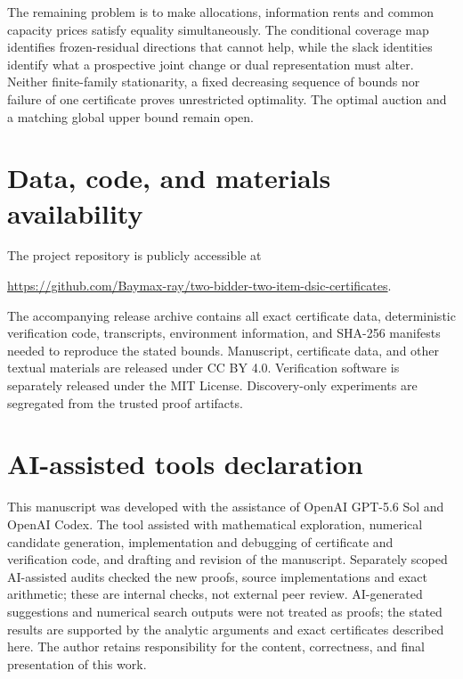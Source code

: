 \documentclass[11pt]{article}
\begin{document}
The remaining problem is to make allocations, information rents and common
capacity prices satisfy equality simultaneously. The conditional coverage
map identifies frozen-residual directions that cannot help, while the slack
identities identify what a prospective joint change or dual representation
must alter. Neither finite-family stationarity, a fixed decreasing sequence
of bounds nor failure of one certificate proves unrestricted optimality.
The optimal auction and a matching global upper bound remain open.

\section*{Data, code, and materials availability}

The project repository is publicly accessible at
\begin{center}\small
\url{https://github.com/Baymax-ray/two-bidder-two-item-dsic-certificates}.
\end{center}
The accompanying release archive contains all exact certificate data, deterministic
verification code, transcripts, environment information, and SHA-256
manifests needed to reproduce the stated bounds.  Manuscript, certificate
data, and other textual materials are released under CC BY 4.0.  Verification
software is separately released under the MIT License.  Discovery-only
experiments are segregated from the trusted proof artifacts.

\section*{AI-assisted tools declaration}

This manuscript was developed with the assistance of OpenAI GPT-5.6 Sol and OpenAI Codex.
The tool assisted with mathematical exploration, numerical candidate
generation, implementation and debugging of certificate and verification
code, and drafting and revision of the manuscript. Separately scoped AI-assisted
audits checked the new proofs, source implementations and exact arithmetic;
these are internal checks, not external peer review. AI-generated suggestions
and numerical search outputs were not treated as proofs; the stated results
are supported by the analytic arguments and exact certificates described
here.  The author retains responsibility for the content, correctness, and
final presentation of this work.


\begingroup
\small
\sloppy
\raggedright

\endgroup
\end{document}
